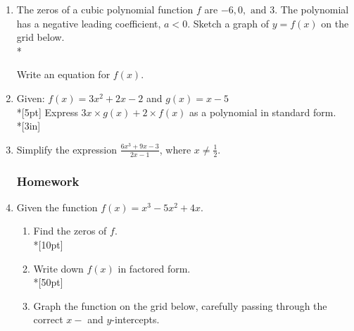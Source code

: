 \documentclass[12pt, oneside]{article}
\begin{document}
\begin{enumerate}
\newpage
\item The zeros of a cubic polynomial function $f$ are  $-6, 0, \text{ and } 3$. The polynomial has a negative leading coefficient, $a<0$. Sketch a graph of $y = f(x)$ on the grid below.\\*
\begin{center}
\end{center}
Write an equation for $f(x)$.

\newpage



\item Given: $f(x)=3x^2+ 2x - 2$ and $g(x)=x-5$\\*[5pt]
Express $3x \times g(x) + 2 \times  f(x)$ as a polynomial in standard form. \\*[3in]


\item Simplify the expression $\displaystyle \frac{6x^3+9x-3}{2x-1}$, where $x \neq \frac{1}{2}$. 

\newpage
\subsubsection*{Homework}

\item Given the function $f(x)=x^3-5x^2+4x$. 
\begin{enumerate}
    \item Find the zeros of $f$.\\*[10pt]
    \item Write down $f(x)$ in factored form.\\*[50pt]
    \item Graph the function on the grid below, carefully passing through the correct $x-$ and $y$-intercepts. 
\end{enumerate}
\begin{center}
\end{center}


\end{enumerate}
\end{document}

